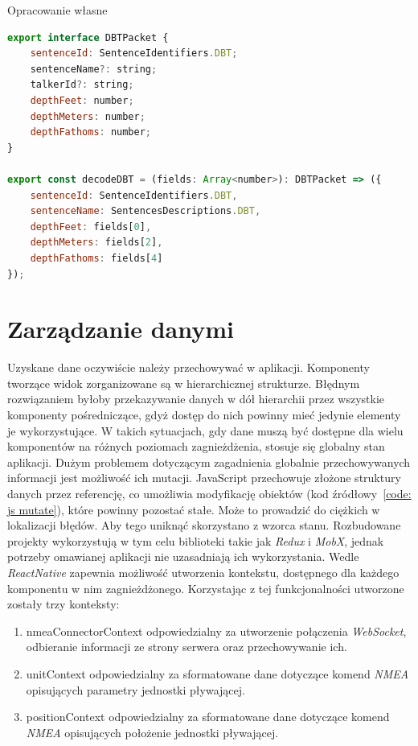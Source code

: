 \documentclass[skorowidz,skroty]{dyplomWEZUT}
\begin{document}
{Opracowanie własne}{\label{code: DBT codec}}
\begin{lstlisting}[language=JavaScript]
export interface DBTPacket {
    sentenceId: SentenceIdentifiers.DBT;
    sentenceName?: string;
    talkerId?: string;
    depthFeet: number;
    depthMeters: number;
    depthFathoms: number;
}

export const decodeDBT = (fields: Array<number>): DBTPacket => ({
    sentenceId: SentenceIdentifiers.DBT,
    sentenceName: SentencesDescriptions.DBT,
    depthFeet: fields[0],
    depthMeters: fields[2],
    depthFathoms: fields[4]
});

\end{lstlisting}

\section{Zarządzanie danymi}\label{sec: server communication}
Uzyskane dane oczywiście należy przechowywać w aplikacji. Komponenty tworzące widok zorganizowane są w hierarchicznej strukturze. Błędnym rozwiązaniem byłoby przekazywanie danych w dół hierarchii przez wszystkie komponenty pośredniczące, gdyż dostęp do nich powinny mieć jedynie elementy je wykorzystujące. W takich sytuacjach, gdy dane muszą być dostępne dla wielu komponentów na różnych poziomach zagnieżdżenia, stosuje się globalny stan aplikacji. Dużym problemem dotyczącym zagadnienia globalnie przechowywanych informacji jest możliwość ich mutacji. JavaScript przechowuje złożone struktury danych przez referencję, co umożliwia modyfikację obiektów (kod źródłowy~\ref{code: js mutate}), które powinny pozostać stałe. Może to prowadzić do ciężkich w lokalizacji błędów. Aby tego uniknąć skorzystano z wzorca stanu. Rozbudowane projekty wykorzystują w tym celu biblioteki takie jak \textit{Redux} i \textit{MobX}, jednak potrzeby omawianej aplikacji nie uzasadniają ich wykorzystania. Wedle \cite{ReactNative} \textit{ReactNative} zapewnia możliwość utworzenia kontekstu, dostępnego dla każdego komponentu w nim zagnieżdżonego. Korzystając z tej funkcjonalności utworzone zostały trzy konteksty:

\begin{enumerate}
 \item nmeaConnectorContext odpowiedzialny za utworzenie połączenia \textit{WebSocket}, odbieranie informacji ze strony serwera oraz przechowywanie ich. 
 
 \item unitContext odpowiedzialny za sformatowane dane dotyczące komend \textit{NMEA} opisujących parametry jednostki pływającej. 
 
 \item positionContext odpowiedzialny za sformatowane dane dotyczące komend \textit{NMEA} opisujących położenie jednostki pływającej. 
 
\end{enumerate}
\end{document}
